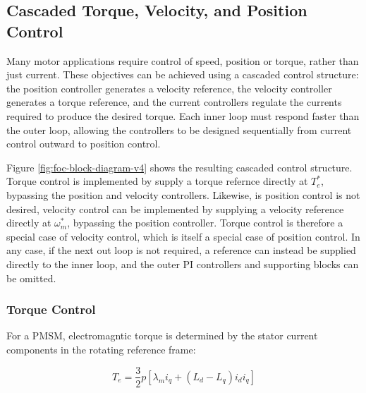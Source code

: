 \documentclass{article}
\newcommand{\FOCPageOverlay}{%
    \thispagestyle{empty}%
    \begin{tikzpicture}[remember picture,overlay]
        \node[anchor=south,yshift=12mm]
            at (current page.south) {%
                \begin{minipage}{0.9\paperwidth}
                    \captionof{figure}{Cascaded Torque, Velocity,
                    and Position Control Structure}
                    \label{fig:foc-block-diagram-v4}
                \end{minipage}%
            };
        \node[anchor=south,yshift=4mm]
            at (current page.south) {\thepage};
    \end{tikzpicture}%
}
\begin{document}
\subsection{Cascaded Torque, Velocity, and Position Control}
\label{sec:torque-velocity-position-control}

Many motor applications require control of speed, position or torque, rather than just current. These objectives can be achieved using a cascaded control structure: the position controller generates a velocity reference, the velocity controller generates a torque reference, and the current controllers regulate the currents required to produce the desired torque. Each inner loop must respond faster than  the outer loop, allowing the controllers to be designed sequentially from current control outward to position control.



Figure \ref{fig:foc-block-diagram-v4} shows the resulting cascaded control structure. Torque control is implemented by supply a torque refernce directly at $T_e^*$, bypassing the position and velocity controllers. Likewise, is position control is not desired, velocity control can be implemented by supplying a velocity reference directly at $\omega_m^*$, bypassing the position controller. Torque control is therefore a special case of velocity control, which is itself a special case of position control. In any case, if the next out loop is not required, a reference can instead be supplied directly to the inner loop, and the outer PI controllers and supporting blocks can be omitted.


\subsubsection{Torque Control}
\label{sec:torque-control}

For a PMSM, electromagntic torque is determined by the stator current components in the rotating reference frame:

\begin{equation}
    T_e = \frac{3}{2}p\left[\lambda_mi_q + (L_d - L_q)i_di_q\right]
\end{equation}
\end{document}
